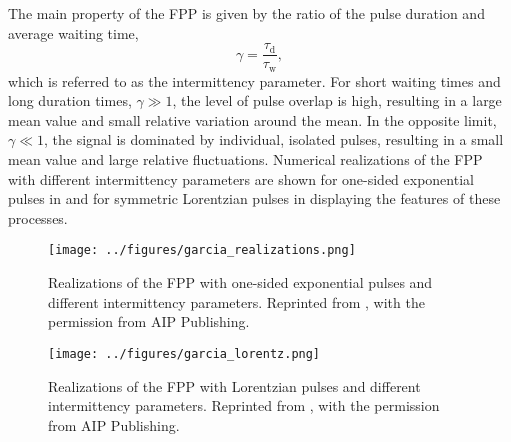 The main property of the FPP is given by the ratio of the pulse duration and average waiting time, 
\begin{equation}
	\gamma = \frac{\tau_\mathrm{d}}{\tau_\mathrm{w}},
\end{equation}
which is referred to as the intermittency parameter. For short waiting times and long duration times, $\gamma \gg 1$, the level of pulse overlap is high, resulting in a large mean value and small relative variation around the mean. In the opposite limit, $\gamma \ll 1$, the signal is dominated by individual, isolated pulses, resulting in a small mean value and large relative fluctuations. Numerical realizations of the FPP with different intermittency parameters are shown for one-sided exponential pulses in  and for symmetric Lorentzian pulses in  displaying the features of these processes. 
\begin{figure}
	\centering
	\begin{minipage}{.48\linewidth}
		\texttt{[image: ../figures/garcia\_realizations.png]}
		\caption{Realizations of the FPP with one-sided exponential pulses and different intermittency parameters. Reprinted from \cite{garcia2016stochastic}, with the permission from AIP Publishing.}
		\label{Fig:garcia_realizations}
	\end{minipage}
	\hfill
	\begin{minipage}{.48\linewidth}
		\texttt{[image: ../figures/garcia\_lorentz.png]}
		\caption{Realizations of the FPP with Lorentzian pulses and different intermittency parameters. Reprinted from \cite{garcia2017power}, with the permission from AIP Publishing.}
		\label{Fig:garcia_realizations_lorentz}
	\end{minipage}
\end{figure}

